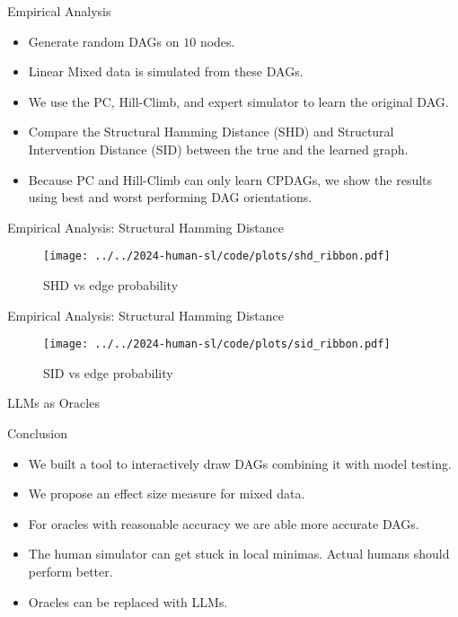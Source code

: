 \documentclass{beamer}
\begin{document}
\begin{frame}{Empirical Analysis}
	\begin{itemize}
		\item Generate random DAGs on $10$ nodes.
		\item Linear Mixed data is simulated from these DAGs.
		\item We use the PC, Hill-Climb, and expert simulator to learn the original DAG.
		\item Compare the Structural Hamming Distance (SHD) and Structural Intervention Distance (SID) between the true and the learned graph.
		\item Because PC and Hill-Climb can only learn CPDAGs, we show the results using best and worst performing DAG orientations.
	\end{itemize}
\end{frame}


\begin{frame}{Empirical Analysis: Structural Hamming Distance}
	\begin{figure}
		\centering
		\texttt{[image: ../../2024-human-sl/code/plots/shd\_ribbon.pdf]}
		\caption{SHD vs edge probability}
	\end{figure}
\end{frame}

\begin{frame}{Empirical Analysis: Structural Hamming Distance}
	\begin{figure}
		\centering
		\texttt{[image: ../../2024-human-sl/code/plots/sid\_ribbon.pdf]}
		\caption{SID vs edge probability}
	\end{figure}
\end{frame}

\begin{frame}{LLMs as Oracles}
\end{frame}

\begin{frame}{Conclusion}
	\begin{itemize}
		\item We built a tool to interactively draw DAGs combining it with model testing.
		\item We propose an effect size measure for mixed data.
		\item For oracles with reasonable accuracy we are able more accurate DAGs.
		\item The human simulator can get stuck in local minimas. Actual humans should perform better.
		\item Oracles can be replaced with LLMs.
	\end{itemize}
\end{frame}
\end{document}
